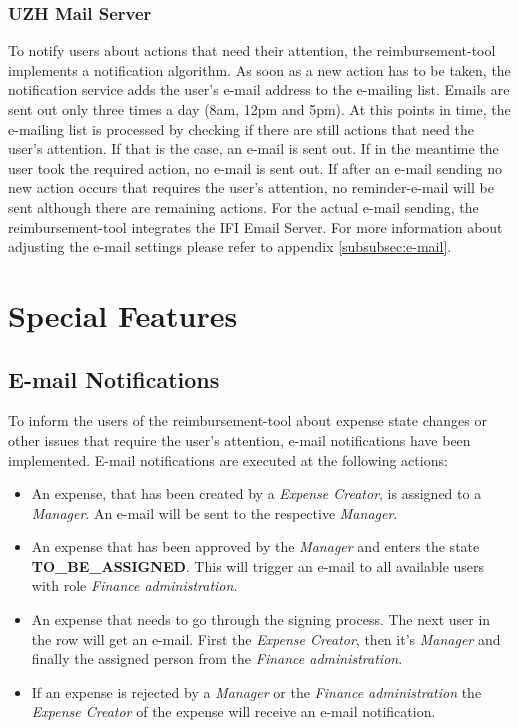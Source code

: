 \subsubsection{UZH Mail Server}
To notify users about actions that need their attention, the reimbursement-tool implements a notification algorithm. As soon as a new action has to be taken, the notification service adds the user's e-mail address to the e-mailing list. Emails are sent out only three times a day (8am, 12pm and 5pm). At this points in time, the e-mailing list is processed by checking if there are still actions that need the user's attention. If that is the case, an e-mail is sent out. If in the meantime the user took the required action, no e-mail is sent out. If after an e-mail sending no new action occurs that requires the user's attention, no reminder-e-mail will be sent although there are remaining actions. For the actual e-mail sending, the reimbursement-tool integrates the IFI Email Server. For more information about adjusting the e-mail settings please refer to appendix \ref{subsubsec:e-mail}.

\newpage



\section{Special Features}

\subsection{E-mail Notifications}
\label{sec:emailnotification}
To inform the users of the reimbursement-tool about expense state changes or other issues that require the user's attention, e-mail notifications have been implemented. E-mail notifications are executed at the following actions:
\begin{itemize}
	\item An expense, that has been created by a \textit{Expense Creator}, is assigned to a \textit{Manager}. An e-mail will be sent to the respective \textit{Manager}.
	\item An expense that has been approved by the \textit{Manager} and enters the state \newline \textbf{TO\_BE\_ASSIGNED}. This will trigger an e-mail to all available users with role \textit{Finance administration}.
	\item An expense that needs to go through the signing process. The next user in the row will get an e-mail. First the \textit{Expense Creator}, then it's \textit{Manager} and finally the assigned person from the \textit{Finance administration}.
	\item If an expense is rejected by a \textit{Manager} or the \textit{Finance administration} the \textit{Expense Creator} of the expense will receive an e-mail notification.
\end{itemize}

